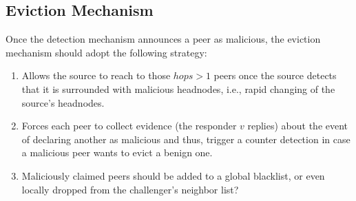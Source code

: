 \subsection{Eviction Mechanism}
Once the detection mechanism announces a peer as malicious, the eviction mechanism should adopt the following strategy:

\begin{enumerate}
 \item Allows the source to reach to those $hops>1$ peers once the source detects that it is surrounded with malicious headnodes, i.e., rapid changing of the source's headnodes.
 \item Forces each peer to collect evidence (the responder $v$ replies) about the event of declaring another as malicious and thus, trigger a counter detection in case a malicious peer wants to evict a benign one.
 \item Maliciously claimed peers should be added to a global blacklist, or even locally dropped from the challenger's neighbor list?
\end{enumerate}

